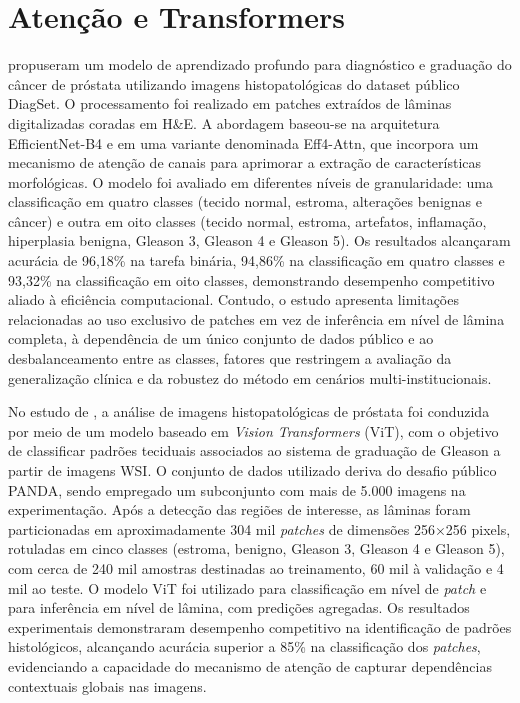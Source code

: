 \section{Atenção e Transformers}

\cite{alici2024efficient} propuseram um modelo de aprendizado profundo para diagnóstico e graduação do câncer de próstata utilizando imagens histopatológicas do dataset público DiagSet. O processamento foi realizado em patches extraídos de lâminas digitalizadas coradas em H\&E. A abordagem baseou-se na arquitetura EfficientNet-B4 e em uma variante denominada Eff4-Attn, que incorpora um mecanismo de atenção de canais para aprimorar a extração de características morfológicas. O modelo foi avaliado em diferentes níveis de granularidade: uma classificação em quatro classes (tecido normal, estroma, alterações benignas e câncer) e outra em oito classes (tecido normal, estroma, artefatos, inflamação, hiperplasia benigna, Gleason 3, Gleason 4 e Gleason 5). Os resultados alcançaram acurácia de 96,18\% na tarefa binária, 94,86\% na classificação em quatro classes e 93,32\% na classificação em oito classes, demonstrando desempenho competitivo aliado à eficiência computacional. Contudo, o estudo apresenta limitações relacionadas ao uso exclusivo de patches em vez de inferência em nível de lâmina completa, à dependência de um único conjunto de dados público e ao desbalanceamento entre as classes, fatores que restringem a avaliação da generalização clínica e da robustez do método em cenários multi-institucionais.

No estudo de \cite{ikromjanov2021vit_prostate}, a análise de imagens histopatológicas de próstata foi conduzida por meio de um modelo baseado em \textit{Vision Transformers} (ViT), com o objetivo de classificar padrões teciduais associados ao sistema de graduação de Gleason a partir de imagens WSI. O conjunto de dados utilizado deriva do desafio público PANDA, sendo empregado um subconjunto com mais de 5.000 imagens na experimentação. Após a detecção das regiões de interesse, as lâminas foram particionadas em aproximadamente 304 mil \textit{patches} de dimensões 256×256 pixels, rotuladas em cinco classes (estroma, benigno, Gleason 3, Gleason 4 e Gleason 5), com cerca de 240 mil amostras destinadas ao treinamento, 60 mil à validação e 4 mil ao teste. O modelo ViT foi utilizado para classificação em nível de \textit{patch} e para inferência em nível de lâmina, com predições agregadas. Os resultados experimentais demonstraram desempenho competitivo na identificação de padrões histológicos, alcançando acurácia superior a 85\% na classificação dos \textit{patches}, evidenciando a capacidade do mecanismo de atenção de capturar dependências contextuais globais nas imagens. 

